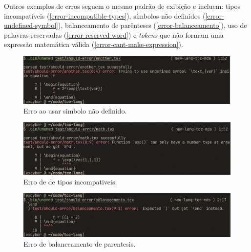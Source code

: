 Outros exemplos de erros seguem o mesmo padrão de exibição e incluem: tipos incompatíveis (\autoref{error-incompatible-types}), símbolos não definidos (\autoref{error-undefined-symbol}), balanceamento de parênteses (\autoref{error-balanceamento}), uso de palavras reservadas (\autoref{error-reserved-word}) e \textit{tokens} que não formam uma expressão matemática válida (\autoref{error-cant-make-expression}).
    


\begin{figure}[H]
    \caption{\label{error-undefined-symbol} \small Erro ao usar simbolo não definido.}
    \begin{center}
        \includegraphics[scale=0.5]{./Imagens/error-undefined-symbol.png}
    \end{center}
\end{figure}

\begin{figure}[H]
    \caption{\label{error-incompatible-types} \small Erro de de tipos incompativeis.}
    \begin{center}
        \includegraphics[scale=0.5]{./Imagens/error-incompatible-types.png}
    \end{center}
\end{figure}


\begin{figure}[H]
    \caption{\label{error-balanceamento} \small Erro de balanceamento de parentesis.}
    \begin{center}
        \includegraphics[scale=0.5]{./Imagens/error-balanceamento.png}
    \end{center}
\end{figure}

